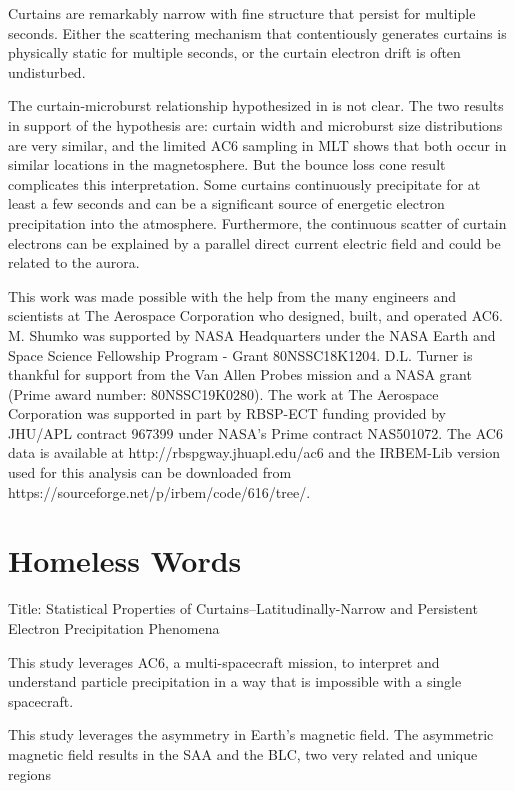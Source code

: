 \documentclass[draft]{agujournal2019}
\begin{document}
Curtains are remarkably narrow with fine structure that persist for multiple seconds. Either the scattering mechanism that contentiously generates curtains is physically static for multiple seconds, or the curtain electron drift is often undisturbed. 

The curtain-microburst relationship hypothesized in  is not clear. The two results in support of the hypothesis are: curtain width and microburst size distributions are very similar, and the limited AC6 sampling in MLT shows that both occur in similar locations in the magnetosphere. But the bounce loss cone result complicates this interpretation. Some curtains continuously precipitate for at least a few seconds and can be a significant source of energetic electron precipitation into the atmosphere. Furthermore, the continuous scatter of curtain electrons can be explained by a parallel direct current electric field and could be related to the aurora.


\acknowledgments
This work was made possible with the help from the many engineers and scientists at The Aerospace Corporation who designed, built, and operated AC6. M. Shumko was supported by NASA Headquarters under the NASA Earth and Space Science Fellowship Program - Grant 80NSSC18K1204. D.L. Turner is thankful for support from the Van Allen Probes mission and a NASA grant (Prime award number: 80NSSC19K0280). The work at The Aerospace Corporation was supported in part by RBSP-ECT funding provided by JHU/APL contract 967399 under NASA's Prime contract NAS501072. The AC6 data is available at http://rbspgway.jhuapl.edu/ac6 and the IRBEM-Lib version used for this analysis can be downloaded from https://sourceforge.net/p/irbem/code/616/tree/.

\section{Homeless Words}

Title: Statistical Properties of Curtains--Latitudinally-Narrow and Persistent Electron Precipitation Phenomena

This study leverages AC6, a multi-spacecraft mission, to interpret and understand particle precipitation in a way that is impossible with a single spacecraft.

This study leverages the asymmetry in Earth's magnetic field. The asymmetric magnetic field results in the SAA and the BLC, two very related and unique regions
\end{document}
